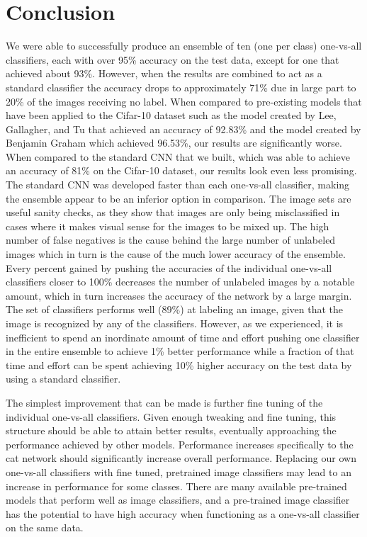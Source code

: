 \documentclass[10pt,twocolumn,letterpaper]{article}
\begin{document}
\section{Conclusion}
We were able to successfully produce an ensemble of ten (one per class) one-vs-all classifiers, each with over 95\% accuracy on the test data, except for one that achieved about 93\%. However, when the results are combined to act as a standard classifier the accuracy drops to approximately 71\% due in large part to 20\% of the images receiving no label. When compared to pre-existing models that have been applied to the Cifar-10 dataset such as the model created by Lee, Gallagher, and Tu that achieved an accuracy of 92.83\% and the model created by Benjamin Graham which achieved 96.53\%, our results are significantly worse.  When compared to the standard CNN that we built, which was able to achieve an accuracy of 81\% on the Cifar-10 dataset, our results look even less promising. The standard CNN was developed faster than each one-vs-all classifier, making the ensemble appear to be an inferior option in comparison. The image sets are useful sanity checks, as they show that images are only being misclassified in cases where it makes visual sense for the images to be mixed up. The high number of false negatives is the cause behind the large number of unlabeled images which in turn is the cause of the much lower accuracy of the ensemble. Every percent gained by pushing the accuracies of the individual one-vs-all classifiers closer to 100\% decreases the number of unlabeled images by a notable amount, which in turn increases the accuracy of the network by a large margin. The set of classifiers performs well (89\%) at labeling an image, given that the image is recognized by any of the classifiers. However, as we experienced, it is inefficient to spend an inordinate amount of time and effort pushing one classifier in the entire ensemble to achieve 1\% better performance while a fraction of that time and effort can be spent achieving 10\% higher accuracy on the test data by using a standard classifier.

The simplest improvement that can be made is further fine tuning of the individual one-vs-all classifiers. Given enough tweaking and fine tuning, this structure should be able to attain better results, eventually approaching the performance achieved by other models. Performance increases specifically to the cat network should significantly increase overall performance. Replacing our own one-vs-all classifiers with fine tuned, pretrained image classifiers may lead to an increase in performance for some classes. There are many available pre-trained models that perform well as image classifiers, and a pre-trained image classifier has the potential to have high accuracy when functioning as a one-vs-all classifier on the same data.
\end{document}

